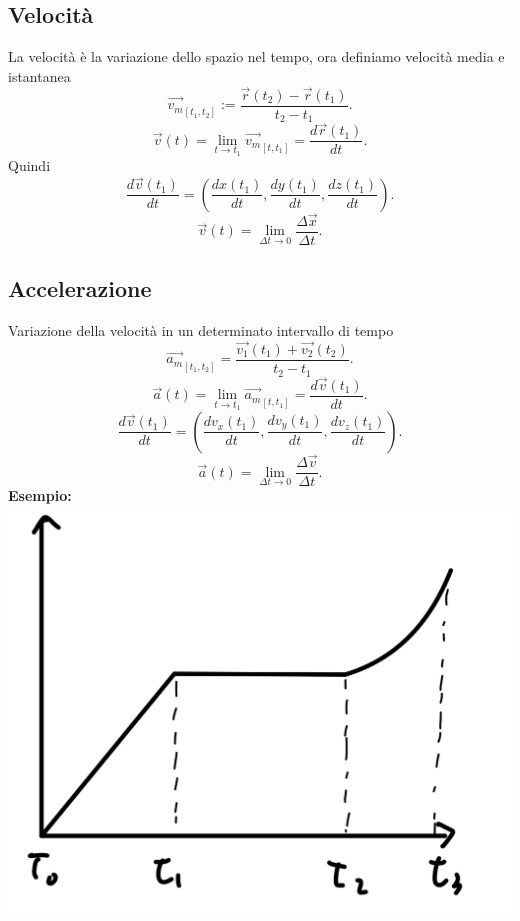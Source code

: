 \documentclass[12px]{article}
\begin{document}
\subsection{Velocità}
La velocità è la variazione dello spazio nel tempo, ora definiamo velocità media e istantanea
\[
	\overrightarrow{v_m}_{[t_1,t_2]} := \frac{\overrightarrow{r}(t_2) - \overrightarrow{r}(t_1)}{t_2 - t_1}
.\] 
\[
	\overrightarrow{v}(t) = \lim_{t \rightarrow t_1} \overrightarrow{v_m}_{[t,t_1]} = \frac {d \overrightarrow{r}(t_1)}{dt}
.\] 
Quindi
\[\frac {d \overrightarrow{v}(t_1)}{dt} = \left( \frac {d x(t_1)}{dt},\frac {d y(t_1)}{dt},\frac {d z(t_1)}{dt}\right)
.\] 
\[
	\overrightarrow{v}(t) = \lim_{\Delta t \rightarrow 0}\frac{\Delta \overrightarrow{x}}{\Delta t}
.\] 
\subsection{Accelerazione}
Variazione della velocità in un determinato intervallo di tempo\\
\[
	\overrightarrow{a_m}_{[t_1,t_2]} = \frac{\overrightarrow{v_1}(t_1) + \overrightarrow{v_2}(t_2)}{t_2 - t_1}
.\] 
\[
	\overrightarrow{a}(t) = \lim_{t \rightarrow t_1} \overrightarrow{a_m}_{[t,t_1]} = \frac {d \overrightarrow{v}(t_1)}{dt}
.\] 
\[\frac {d \overrightarrow{v}(t_1)}{dt} = \left( \frac {d v_x(t_1)}{dt},\frac {d v_y(t_1)}{dt},\frac {d v_z(t_1)}{dt}\right)
.\] 
\[
	\overrightarrow{a}(t) = \lim_{\Delta t \rightarrow 0}\frac{\Delta \overrightarrow{v}}{\Delta t}
.\] 
\textbf{Esempio:}\\
\includegraphics[scale=0.1]{grafico_2}\\
\end{document}
